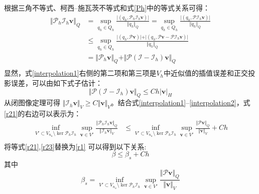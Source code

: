 根据三角不等式、柯西--施瓦茨不等式和式\eqref{Ph}中的等式关系可得：
\begin{equation}\label{interpolation1}
    \begin{split}
        \Vert \mathcal P_h \mathcal I_h \boldsymbol v \Vert_Q &= 
        \sup_{q_h \in Q_h} \frac{\vert (q_h, \mathcal P_h \mathcal I_h \boldsymbol v) \vert}{\Vert q_h \Vert_Q}
        =\sup_{q_h \in Q_h} \frac{\vert (q_h, \mathcal P \mathcal I_h \boldsymbol v) \vert}{\Vert q_h \Vert_Q} \\
        &\le \sup_{q_h \in Q_h} \frac{\vert (q_h, \mathcal P \boldsymbol v)\vert + \vert (q_h, \mathcal P \boldsymbol v - \mathcal P \mathcal I_h \boldsymbol v) \vert}{\Vert q_h \Vert_Q} \\
        &= \Vert \mathcal P_h \boldsymbol v \Vert_Q
        + \Vert \mathcal P(\mathcal I - \mathcal I_h) \boldsymbol v \Vert_Q \\
    \end{split}
\end{equation}
显然，式\eqref{interpolation1}右侧的第二项和第三项是$V_h$中近似值的插值误差和正交投影误差，可以由如下式子估计\cite{yosida1995}：
\begin{equation}\label{interpolation2}
        \Vert \mathcal P(\mathcal I - \mathcal I_h) \boldsymbol v \Vert_Q \le Ch \vert \boldsymbol v \vert_{H} 
\end{equation}
从闭图像定理\cite{quarteroni1994}可得 $\Vert \mathcal I_h \boldsymbol v\Vert_V \ge C\Vert \boldsymbol v \Vert_V$。结合式\eqref{interpolation1}--\eqref{interpolation2}，式\eqref{r21}的右边可以表示为：
\begin{equation}\label{r23}
    \begin{split}
        \inf_{V'\subset V_{n_u}\setminus \ker \mathcal P_h \mathcal I_h} \sup_{\boldsymbol v \in V'} \frac{\Vert \mathcal P_h\mathcal I_h\boldsymbol v\Vert_Q}{\Vert \mathcal I_h \boldsymbol v\Vert_V} 
        &\le \inf_{V'\subset V_{n_u}\setminus \ker \mathcal P_h \mathcal I_h} \sup_{\boldsymbol v \in V'} \frac{\Vert \mathcal P \boldsymbol v\Vert_Q}{\Vert \boldsymbol v\Vert_V} + Ch \\
    \end{split}
\end{equation}
将等式\eqref{r21},\eqref{r23}替换为\eqref{r1} 可以得到以下关系:
\begin{equation}\label{r3}
    \beta \le \beta_s + Ch
\end{equation}
其中
\begin{equation}
    \beta_s = \inf_{V'\subset V_{n_u}\setminus\ker \mathcal P_h \mathcal I_h}\sup_{\boldsymbol v \in V'}\frac{\Vert \mathcal P \boldsymbol v\Vert_Q}{\Vert  \boldsymbol v\Vert_V} 
\end{equation}

